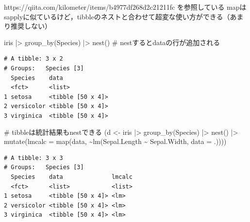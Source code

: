 \documentclass[
  letterpaper,
  DIV=11,
  numbers=noendperiod]{scrreprt}
\newenvironment{Shaded}{\begin{snugshade}}{\end{snugshade}}
\newcommand{\AttributeTok}[1]{\textcolor[rgb]{0.40,0.45,0.13}{#1}}
\newcommand{\CommentTok}[1]{\textcolor[rgb]{0.37,0.37,0.37}{#1}}
\newcommand{\FunctionTok}[1]{\textcolor[rgb]{0.28,0.35,0.67}{#1}}
\newcommand{\NormalTok}[1]{\textcolor[rgb]{0.00,0.23,0.31}{#1}}
\newcommand{\OtherTok}[1]{\textcolor[rgb]{0.00,0.23,0.31}{#1}}
\newcommand{\SpecialCharTok}[1]{\textcolor[rgb]{0.37,0.37,0.37}{#1}}
\begin{document}
https://qiita.com/kilometer/items/b4977df268d2c21211fc を参照している
mapはsapplyに似ているけど，tibbleのネストと合わせて超変な使い方ができる（あまり推奨しない）

\begin{Shaded}
\begin{Highlighting}[]
\NormalTok{iris }\SpecialCharTok{|\textgreater{}} \FunctionTok{group\_by}\NormalTok{(Species) }\SpecialCharTok{|\textgreater{}} \FunctionTok{nest}\NormalTok{() }\CommentTok{\# nestするとdataの行が追加される}
\end{Highlighting}
\end{Shaded}

\begin{verbatim}
# A tibble: 3 x 2
# Groups:   Species [3]
  Species    data             
  <fct>      <list>           
1 setosa     <tibble [50 x 4]>
2 versicolor <tibble [50 x 4]>
3 virginica  <tibble [50 x 4]>
\end{verbatim}

\begin{Shaded}
\begin{Highlighting}[]
\CommentTok{\# tibbleは統計結果もnestできる}
\NormalTok{(d }\OtherTok{\textless{}{-}}\NormalTok{ iris }\SpecialCharTok{|\textgreater{}} \FunctionTok{group\_by}\NormalTok{(Species) }\SpecialCharTok{|\textgreater{}} \FunctionTok{nest}\NormalTok{() }\SpecialCharTok{|\textgreater{}} \FunctionTok{mutate}\NormalTok{(}\AttributeTok{lmcalc =} \FunctionTok{map}\NormalTok{(data, }\SpecialCharTok{\textasciitilde{}}\FunctionTok{lm}\NormalTok{(Sepal.Length }\SpecialCharTok{\textasciitilde{}}\NormalTok{ Sepal.Width, }\AttributeTok{data =}\NormalTok{ .))))}
\end{Highlighting}
\end{Shaded}

\begin{verbatim}
# A tibble: 3 x 3
# Groups:   Species [3]
  Species    data              lmcalc
  <fct>      <list>            <list>
1 setosa     <tibble [50 x 4]> <lm>  
2 versicolor <tibble [50 x 4]> <lm>  
3 virginica  <tibble [50 x 4]> <lm>  
\end{verbatim}

\begin{Shaded}
\end{Shaded}
\end{document}
